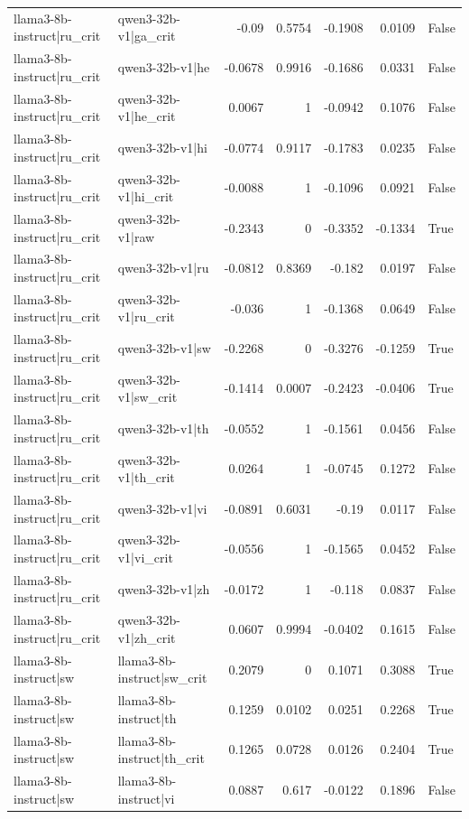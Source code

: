 \begin{table}
\begin{tabular}{l l r r r r l}
llama3-8b-instruct|ru_crit & qwen3-32b-v1|ga_crit & -0.09 & 0.5754 & -0.1908 & 0.0109 & False \\
llama3-8b-instruct|ru_crit & qwen3-32b-v1|he & -0.0678 & 0.9916 & -0.1686 & 0.0331 & False \\
llama3-8b-instruct|ru_crit & qwen3-32b-v1|he_crit & 0.0067 & 1 & -0.0942 & 0.1076 & False \\
llama3-8b-instruct|ru_crit & qwen3-32b-v1|hi & -0.0774 & 0.9117 & -0.1783 & 0.0235 & False \\
llama3-8b-instruct|ru_crit & qwen3-32b-v1|hi_crit & -0.0088 & 1 & -0.1096 & 0.0921 & False \\
llama3-8b-instruct|ru_crit & qwen3-32b-v1|raw & -0.2343 & 0 & -0.3352 & -0.1334 & True \\
llama3-8b-instruct|ru_crit & qwen3-32b-v1|ru & -0.0812 & 0.8369 & -0.182 & 0.0197 & False \\
llama3-8b-instruct|ru_crit & qwen3-32b-v1|ru_crit & -0.036 & 1 & -0.1368 & 0.0649 & False \\
llama3-8b-instruct|ru_crit & qwen3-32b-v1|sw & -0.2268 & 0 & -0.3276 & -0.1259 & True \\
llama3-8b-instruct|ru_crit & qwen3-32b-v1|sw_crit & -0.1414 & 0.0007 & -0.2423 & -0.0406 & True \\
llama3-8b-instruct|ru_crit & qwen3-32b-v1|th & -0.0552 & 1 & -0.1561 & 0.0456 & False \\
llama3-8b-instruct|ru_crit & qwen3-32b-v1|th_crit & 0.0264 & 1 & -0.0745 & 0.1272 & False \\
llama3-8b-instruct|ru_crit & qwen3-32b-v1|vi & -0.0891 & 0.6031 & -0.19 & 0.0117 & False \\
llama3-8b-instruct|ru_crit & qwen3-32b-v1|vi_crit & -0.0556 & 1 & -0.1565 & 0.0452 & False \\
llama3-8b-instruct|ru_crit & qwen3-32b-v1|zh & -0.0172 & 1 & -0.118 & 0.0837 & False \\
llama3-8b-instruct|ru_crit & qwen3-32b-v1|zh_crit & 0.0607 & 0.9994 & -0.0402 & 0.1615 & False \\
llama3-8b-instruct|sw & llama3-8b-instruct|sw_crit & 0.2079 & 0 & 0.1071 & 0.3088 & True \\
llama3-8b-instruct|sw & llama3-8b-instruct|th & 0.1259 & 0.0102 & 0.0251 & 0.2268 & True \\
llama3-8b-instruct|sw & llama3-8b-instruct|th_crit & 0.1265 & 0.0728 & 0.0126 & 0.2404 & True \\
llama3-8b-instruct|sw & llama3-8b-instruct|vi & 0.0887 & 0.617 & -0.0122 & 0.1896 & False \\

\end{tabular}
\end{table}
